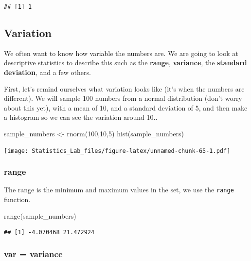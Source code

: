 \documentclass[
]{book}
\newenvironment{Shaded}{\begin{snugshade}}{\end{snugshade}}
\newcommand{\DecValTok}[1]{\textcolor[rgb]{0.00,0.00,0.81}{#1}}
\newcommand{\FunctionTok}[1]{\textcolor[rgb]{0.00,0.00,0.00}{#1}}
\newcommand{\NormalTok}[1]{#1}
\newcommand{\OtherTok}[1]{\textcolor[rgb]{0.56,0.35,0.01}{#1}}
\begin{document}
\begin{verbatim}
## [1] 1
\end{verbatim}

\hypertarget{variation}{%
\subsection{Variation}\label{variation}}

We often want to know how variable the numbers are. We are going to look at descriptive statistics to describe this such as the \textbf{range}, \textbf{variance}, the \textbf{standard deviation}, and a few others.

First, let's remind ourselves what variation looks like (it's when the numbers are different). We will sample 100 numbers from a normal distribution (don't worry about this yet), with a mean of 10, and a standard deviation of 5, and then make a histogram so we can see the variation around 10..

\begin{Shaded}
\begin{Highlighting}[]
\NormalTok{sample\_numbers }\OtherTok{\textless{}{-}} \FunctionTok{rnorm}\NormalTok{(}\DecValTok{100}\NormalTok{,}\DecValTok{10}\NormalTok{,}\DecValTok{5}\NormalTok{)}
\FunctionTok{hist}\NormalTok{(sample\_numbers)}
\end{Highlighting}
\end{Shaded}

\texttt{[image: Statistics\_Lab\_files/figure-latex/unnamed-chunk-65-1.pdf]}

\hypertarget{range}{%
\subsubsection{range}\label{range}}

The range is the minimum and maximum values in the set, we use the \texttt{range} function.

\begin{Shaded}
\begin{Highlighting}[]
\FunctionTok{range}\NormalTok{(sample\_numbers)}
\end{Highlighting}
\end{Shaded}

\begin{verbatim}
## [1] -4.070468 21.472924
\end{verbatim}

\hypertarget{var-variance}{%
\subsubsection{var = variance}\label{var-variance}}
\end{document}
